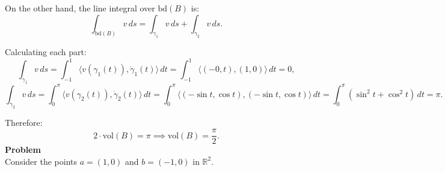 \documentclass{article}
\begin{document}
On the other hand, the line integral over $\text{bd}(B)$ is:
\[
\int_{\text{bd}(B)} v \, ds = \int_{\gamma_1} v \, ds + \int_{\gamma_2} v \, ds.
\]

Calculating each part:
\[
\int_{\gamma_1} v \, ds = \int_{-1}^{1} \langle v(\gamma_1(t)), \dot{\gamma}_1(t) \rangle \, dt = \int_{-1}^{1} \langle (-0, t), (1, 0) \rangle \, dt = 0,
\]
\[
\int_{\gamma_2} v \, ds = \int_{0}^{\pi} \langle v(\gamma_2(t)), \dot{\gamma}_2(t) \rangle \, dt = \int_{0}^{\pi} \langle (-\sin t, \cos t), (-\sin t, \cos t) \rangle \, dt = \int_{0}^{\pi}  (\sin^2 t + \cos^2 t) \, dt = \pi.
\]

Therefore:
\[
2 \cdot \text{vol}(B) = \pi \implies \text{vol}(B) = \frac{\pi}{2}.
\]
\newpage
\textbf{Problem} \\
Consider the points \( a = (1,0) \) and \( b = (-1,0) \) in \(\mathbb{R}^2\).
\end{document}
